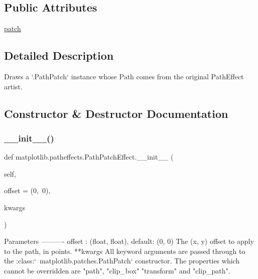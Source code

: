 \subsection*{Public Attributes}
\begin{DoxyCompactItemize}
\item 
\hyperlink{classmatplotlib_1_1patheffects_1_1PathPatchEffect_a679c17057bbed1e543bb0199be2482cd}{patch}
\end{DoxyCompactItemize}


\subsection{Detailed Description}
\begin{DoxyVerb}Draws a `.PathPatch` instance whose Path comes from the original
PathEffect artist.
\end{DoxyVerb}
 

\subsection{Constructor \& Destructor Documentation}
\mbox{\label{classmatplotlib_1_1patheffects_1_1PathPatchEffect_a4000d0d10c3a1099f0d77d5c965c1747}} 
\subsubsection{\texorpdfstring{\+\_\+\+\_\+init\+\_\+\+\_\+()}{\_\_init\_\_()}}
{\footnotesize\ttfamily def matplotlib.\+patheffects.\+Path\+Patch\+Effect.\+\_\+\+\_\+init\+\_\+\+\_\+ (\begin{DoxyParamCaption}\item[{}]{self,  }\item[{}]{offset = {\ttfamily (0,~0)},  }\item[{}]{kwargs }\end{DoxyParamCaption})}

\begin{DoxyVerb}Parameters
----------
offset : (float, float), default: (0, 0)
    The (x, y) offset to apply to the path, in points.
**kwargs
    All keyword arguments are passed through to the
    :class:`~matplotlib.patches.PathPatch` constructor. The
    properties which cannot be overridden are "path", "clip_box"
    "transform" and "clip_path".
\end{DoxyVerb}
 

